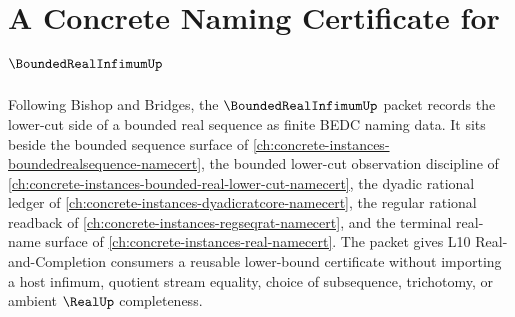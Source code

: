 \chapter{A Concrete Naming Certificate for $\BoundedRealInfimumUp$}
\label{ch:concrete-instances-bounded-real-infimum-namecert}

Following Bishop and Bridges, the $\BoundedRealInfimumUp$ packet records the lower-cut side of a bounded real sequence as finite BEDC naming data. It sits beside the bounded sequence surface of \autoref{ch:concrete-instances-boundedrealsequence-namecert}, the bounded lower-cut observation discipline of \autoref{ch:concrete-instances-bounded-real-lower-cut-namecert}, the dyadic rational ledger of \autoref{ch:concrete-instances-dyadicratcore-namecert}, the regular rational readback of \autoref{ch:concrete-instances-regseqrat-namecert}, and the terminal real-name surface of \autoref{ch:concrete-instances-real-namecert}. The packet gives L10 Real-and-Completion consumers a reusable lower-bound certificate without importing a host infimum, quotient stream equality, choice of subsequence, trichotomy, or ambient $\RealUp$ completeness.

